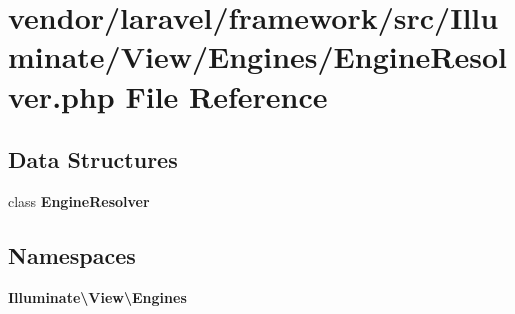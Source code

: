\section{vendor/laravel/framework/src/\+Illuminate/\+View/\+Engines/\+Engine\+Resolver.php File Reference}
\label{_engine_resolver_8php}
\subsection*{Data Structures}
\begin{DoxyCompactItemize}
\item 
class {\bf Engine\+Resolver}
\end{DoxyCompactItemize}
\subsection*{Namespaces}
\begin{DoxyCompactItemize}
\item 
 {\bf Illuminate\textbackslash{}\+View\textbackslash{}\+Engines}
\end{DoxyCompactItemize}

